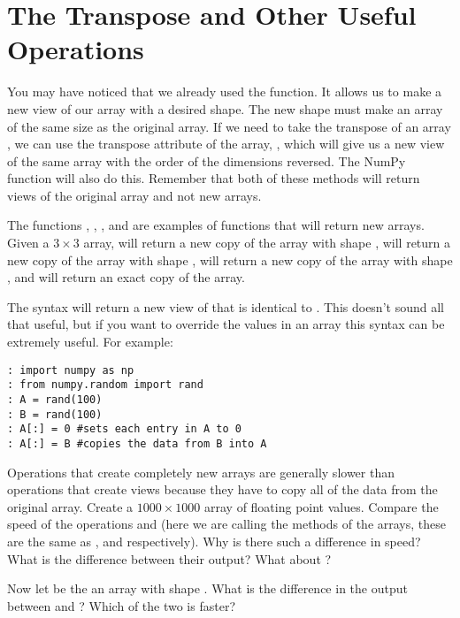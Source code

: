 \section*{The Transpose and Other Useful Operations}
You may have noticed that we already used the  function.
It allows us to make a new view of our array with a desired shape.
The new shape must make an array of the same size as the original array.
If we need to take the transpose of an array , we can use the transpose attribute of the array, , which will give us a new view of the same array with the order of the dimensions reversed.
The NumPy  function will also do this.
Remember that both of these methods will return views of the original array and not new arrays.

The functions , , , and  are examples of functions that will return new arrays.
Given a $3 \times 3$ array,  will return a new copy of the array with shape ,  will return a new copy of the array with shape ,  will return a new copy of the array  with shape , and  will return an exact copy of the array.

The syntax  will return a new view of  that is identical to .
This doesn't sound all that useful, but if you want to override the values in an array this syntax can be extremely useful.
For example:
\begin{lstlisting}
: import numpy as np
: from numpy.random import rand
: A = rand(100)
: B = rand(100)
: A[:] = 0 #sets each entry in A to 0
: A[:] = B #copies the data from B into A
\end{lstlisting}

\begin{problem}
Operations that create completely new arrays are generally slower than operations that create views because they have to copy all of the data from the original array.
Create a $1000 \times 1000$ array  of floating point values.
Compare the speed of the operations  and  (here we are calling the methods of the arrays, these are the same as , and  respectively).
Why is there such a difference in speed?
What is the difference between their output?
What about ?

Now let  be the an array with shape .
What is the difference in the output between  and ?
Which of the two is faster?
\end{problem}

